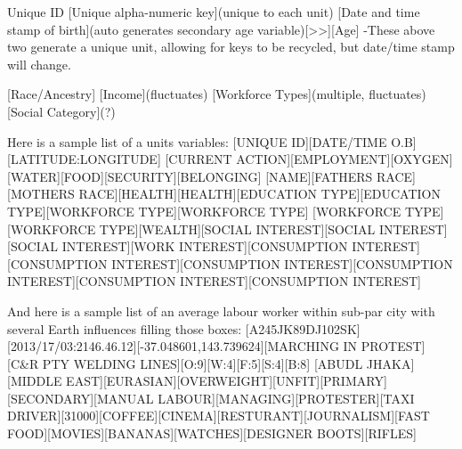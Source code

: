 Unique ID
[Unique alpha-numeric key](unique to each unit)
[Date and time stamp of birth](auto generates secondary age variable)[>>][Age]
-These above two generate a unique unit, allowing for keys to be recycled, but date/time stamp will change.

[Race/Ancestry]
[Income](fluctuates)
[Workforce Types](multiple, fluctuates)
[Social Category](?)


Here is a sample list of a units variables:
[UNIQUE ID][DATE/TIME O.B][LATITUDE:LONGITUDE]
[CURRENT ACTION][EMPLOYMENT][OXYGEN][WATER][FOOD][SECURITY][BELONGING]
[NAME][FATHERS RACE][MOTHERS RACE][HEALTH][HEALTH][EDUCATION TYPE][EDUCATION TYPE][WORKFORCE TYPE][WORKFORCE TYPE]
[WORKFORCE TYPE][WORKFORCE TYPE][WEALTH][SOCIAL INTEREST][SOCIAL INTEREST][SOCIAL INTEREST][WORK INTEREST][CONSUMPTION INTEREST][CONSUMPTION INTEREST][CONSUMPTION INTEREST][CONSUMPTION INTEREST][CONSUMPTION INTEREST][CONSUMPTION INTEREST]

And here is a sample list of an average labour worker within sub-par city with several Earth influences filling those boxes:
[A245JK89DJ102SK][2013/17/03:2146.46.12][-37.048601,143.739624][MARCHING IN PROTEST][C&R PTY WELDING LINES][O:9][W:4][F:5][S:4][B:8]
[ABUDL JHAKA][MIDDLE EAST][EURASIAN][OVERWEIGHT][UNFIT][PRIMARY][SECONDARY][MANUAL LABOUR][MANAGING][PROTESTER][TAXI DRIVER][31000][COFFEE][CINEMA][RESTURANT][JOURNALISM][FAST FOOD][MOVIES][BANANAS][WATCHES][DESIGNER BOOTS][RIFLES]



